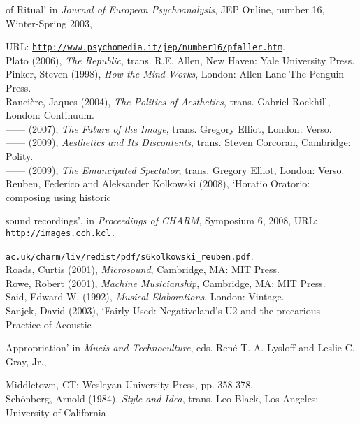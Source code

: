 of Ritual' in \emph{Journal of European Psychoanalysis}, JEP Online, number 16, Winter-Spring 2003, 

URL: \href{http://www.psychomedia.it/jep/number16/pfaller.htm}{\texttt {http://www.psychomedia.it/jep/number16/pfaller.htm}}. 
\hypertarget{plato}{}\\
Plato (2006), \emph{The Republic}, trans. R.E. Allen, New Haven: Yale University Press. 
\hypertarget{pinker}{}\\
Pinker, Steven (1998), \emph{How the Mind Works}, London: Allen Lane The Penguin Press. 
\hypertarget{ranpoli}{}\\
Ranci\`{e}re, Jaques (2004), \emph{The Politics of Aesthetics}, trans. Gabriel Rockhill, London: Continuum. 
\hypertarget{ranimg}{}\\
------ (2007), \emph{The Future of the Image}, trans. Gregory Elliot, London: Verso. 
\hypertarget{ranaesth}{}\\
------ (2009), \emph{Aesthetics and Its Discontents}, trans. Steven Corcoran, Cambridge: Polity. 
\hypertarget{ranspec}{}\\
------ (2009), \emph{The Emancipated Spectator}, trans. Gregory Elliot, London: Verso.
\hypertarget{reuben}{}\\
Reuben, Federico and Aleksander Kolkowski (2008), `Horatio Oratorio: composing using historic 

sound recordings', in \emph{Proceedings of CHARM}, Symposium 6, 2008, URL: \href{http://images.cch.kcl.ac.uk/charm/liv/redist/pdf/s6kolkowski_reuben.pdf}{\texttt{http://images.cch.kcl.}}

\href{http://images.cch.kcl.ac.uk/charm/liv/redist/pdf/s6kolkowski_reuben.pdf}{\texttt{ac.uk/charm/liv/redist/pdf/s6kolkowski\_reuben.pdf}}.
\hypertarget{roads}{}\\
Roads, Curtis (2001), \emph{Microsound}, Cambridge, MA: MIT Press.
\hypertarget{rowe}{}\\
Rowe, Robert (2001), \emph{Machine Musicianship}, Cambridge, MA: MIT Press. 
\hypertarget{said}{}\\
Said, Edward W. (1992), \emph{Musical Elaborations}, London: Vintage. 
\hypertarget{sanjek}{}\\
Sanjek, David (2003), `Fairly Used: Negativeland's U2 and the precarious Practice of Acoustic 

Appropriation' in \emph{Mucis and Technoculture}, eds. Ren\'{e} T. A. Lysloff and Leslie C. Gray, Jr., 

Middletown, CT: Wesleyan University Press, pp. 358-378.
\hypertarget{schoen}{}\\
Sch\"{o}nberg, Arnold (1984),  \emph{Style and Idea}, trans. Leo Black, Los Angeles: University of California

